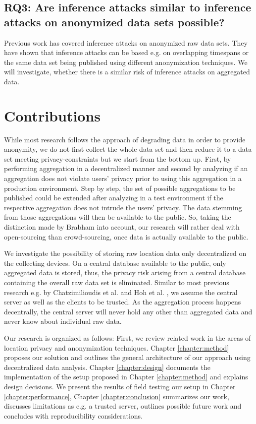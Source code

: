 \subsection*{RQ3: Are inference attacks similar to inference attacks on anonymized data sets possible?}
Previous work has covered inference attacks on anonymized raw data sets. They have shown that inference attacks can be based e.g. on overlapping timespans or the same data set being published using different anonymization techniques. We will investigate, whether there is a similar risk of inference attacks on aggregated data.

\section{Contributions}
While most research follows the approach of degrading data in order to provide anonymity, we do not first collect the whole data set and then reduce it to a data set meeting privacy-constraints but we start from the bottom up. First, by performing aggregation in a decentralized manner and second by analyzing if an aggregation does not violate users' privacy prior to using this aggregation in a production environment. Step by step, the set of possible aggregations to be published could be extended after analyzing in a test environment if the respective aggregation does not intrude the users' privacy. The data stemming from those aggregations will then be available to the public. So, taking the distinction made by Brabham \parencite{brabham2008crowdsourcing} into account, our research will rather deal with open-sourcing than crowd-sourcing, once data is actually available to the public.

We investigate the possibility of storing raw location data only decentralized on the collecting devices. On a central database available to the public, only aggregated data is stored, thus, the privacy risk arising from a central database containing the overall raw data set is eliminated. Similar to most previous research e.g. by Chatzimilioudis et al. \parencite{chatzimilioudis2012crowdsourcing} and Hoh et al. \parencite{hoh2006enhancing}, we assume the central server as well as the clients to be trusted. As the aggregation process happens decentrally, the central server will never hold any other than aggregated data and never know about individual raw data. 

Our research is organized as follows: First, we review related work in the areas of location privacy and anonymization techniques.
Chapter \ref{chapter:method} proposes our solution and outlines the general architecture of our approach using decentralized data analysis. Chapter \ref{chapter:design} documents the implementation of the setup proposed in Chapter \ref{chapter:method} and explains design decisions. We present the results of field testing our setup in Chapter \ref{chapter:performance}, Chapter \ref{chapter:conclusion} summarizes our work, discusses limitations as e.g. a trusted server, outlines possible future work and concludes with reproducibility considerations.